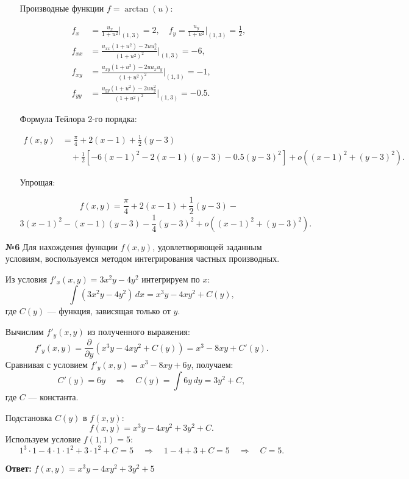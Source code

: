 \documentclass[a4paper]{article}
\begin{document}
\begin{enumerate}
\begin{enumerate}
        Производные функции $f = \arctan(u)$:

        \[
        \begin{aligned}
        f_x &= \frac{u_x}{1 + u^2} \bigg|_{(1,3)} = 2, \quad f_y = \frac{u_y}{1 + u^2} \bigg|_{(1,3)} = \frac{1}{2}, \\
        f_{xx} &= \frac{u_{xx}(1 + u^2) - 2u u_x^2}{(1 + u^2)^2} \bigg|_{(1,3)} = -6, \\
        f_{xy} &= \frac{u_{xy}(1 + u^2) - 2u u_x u_y}{(1 + u^2)^2} \bigg|_{(1,3)} = -1, \\
        f_{yy} &= \frac{u_{yy}(1 + u^2) - 2u u_y^2}{(1 + u^2)^2} \bigg|_{(1,3)} = -0.5.
        \end{aligned}
        \]

        Формула Тейлора 2-го порядка:

        \[
        \begin{aligned}
        f(x, y) &= \frac{\pi}{4} + 2(x - 1) + \frac{1}{2}(y - 3) \\
        &\quad + \frac{1}{2}\left[-6(x - 1)^2 - 2(x - 1)(y - 3) - 0.5(y - 3)^2\right] + o\left((x - 1)^2 + (y - 3)^2\right).
        \end{aligned}
        \]

        Упрощая:

        \[
        f(x, y) = \frac{\pi}{4} + 2(x - 1) + \frac{1}{2}(y - 3) - \]
        \[3(x - 1)^2 - (x - 1)(y - 3) - \frac{1}{4}(y - 3)^2 + o\left((x - 1)^2 + (y - 3)^2\right).
        \]
    \end{enumerate}
    
    \item[\textbf{№6}]Для нахождения функции \( f(x, y) \), удовлетворяющей заданным условиям, воспользуемся методом интегрирования частных производных.

    Из условия \( f'_x(x, y) = 3x^2y - 4y^2 \) интегрируем по \( x \):
    \[
    \int (3x^2y - 4y^2) \, dx = x^3y - 4xy^2 + C(y),
    \]
    где \( C(y) \) — функция, зависящая только от \( y \).

    Вычислим \( f'_y(x, y) \) из полученного выражения:
    \[
    f'_y(x, y) = \frac{\partial}{\partial y} \left( x^3y - 4xy^2 + C(y) \right) = x^3 - 8xy + C'(y).
    \]
    Сравнивая с условием \( f'_y(x, y) = x^3 - 8xy + 6y \), получаем:
    \[
    C'(y) = 6y \quad \Rightarrow \quad C(y) = \int 6y \, dy = 3y^2 + C,
    \]
    где \( C \) — константа.

    Подстановка \( C(y) \) в \( f(x, y) \):
    \[
    f(x, y) = x^3y - 4xy^2 + 3y^2 + C.
    \]
    Используем условие \( f(1, 1) = 5 \):
    \[
    1^3 \cdot 1 - 4 \cdot 1 \cdot 1^2 + 3 \cdot 1^2 + C = 5 \quad \Rightarrow \quad 1 - 4 + 3 + C = 5 \quad \Rightarrow \quad C = 5.
    \]

    \textbf{Ответ: } $f(x, y) = x^3y - 4xy^2 + 3y^2 + 5$


\end{enumerate}
\end{document}
